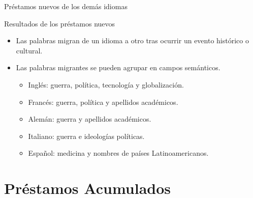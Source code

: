 \documentclass[10pt,xcolor={usenames,dvipsnames}]{beamer}
\begin{document}
\begin{frame}{Préstamos nuevos de los demás idiomas}
\vspace{5mm}
\end{frame}

\begin{frame}[fragile]{Resultados de los préstamos nuevos}
	\begin{itemize}
		\item<1->[$\blacksquare$]Las palabras migran de un idioma a otro tras ocurrir un evento histórico o cultural.\\
		
		\item<2>[$\blacksquare$] Las palabras migrantes se pueden agrupar en campos semánticos. 
		
		\begin{itemize}
			\item Inglés: guerra, política, tecnología y globalización.
			\item Francés: guerra, política y apellidos académicos.
			\item Alemán: guerra y apellidos académicos.
			\item Italiano: guerra e ideologías políticas.
			\item Español: medicina y nombres de países Latinoamericanos. 
		\end{itemize}
	\end{itemize}
\end{frame}


\section{Préstamos Acumulados}
\end{document}
